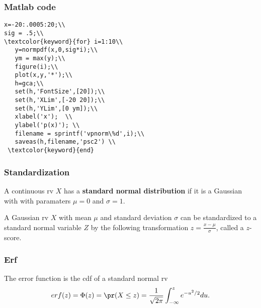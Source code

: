 \begin{frame}[fragile]\frametitle{Matlab code}

{\tiny

\begin{lstlisting}
x=-20:.0005:20;\\
sig = .5;\\
\textcolor{keyword}{for} i=1:10\\
   y=normpdf(x,0,sig*i);\\
   ym = max(y);\\
   figure(i);\\
   plot(x,y,'*');\\
   h=gca;\\
   set(h,'FontSize',[20]);\\
   set(h,'XLim',[-20 20]);\\
   set(h,'YLim',[0 ym]);\\
   xlabel('x');  \\
   ylabel('p(x)'); \\
   filename = sprintf('vpnorm\%d',i);\\
   saveas(h,filename,'psc2') \\
 \textcolor{keyword}{end}
\end{lstlisting}
}
\end{frame}





\begin{frame}[fragile]\frametitle{Standardization}

\begin{defn}
A continuous rv $X$ has a {\bf standard normal distribution}
if it is a Gaussian with  with paramaters
$\mu = 0$ and $\sigma=1$. 
\end{defn}


\begin{defn}
A Gaussian rv $X$ with mean $\mu$ and standard deviation $\sigma$
can be standardized to a standard normal variable $Z$ by the following
transformation $z=\frac{x-\mu}{\sigma}$, called a $z$-score. 

\end{defn}
\end{frame}



\begin{frame}[fragile]\frametitle{Erf}

\begin{defn}
The error function is the cdf of a standard normal rv
$$erf(z) = \Phi(z) = \pr(X \leq z) = \frac{1}{\sqrt{2 \pi}}\int_{-\infty}^z 
e^{-u^2/2} du.$$
\end{defn}
\end{frame}


